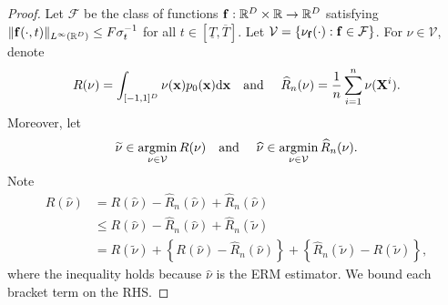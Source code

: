 \documentclass[twoside,11pt]{article}
\def\cF{\mathcal F}
\def\cV{\mathcal V}
\newcommand{\bff}{{\bf f}}
\newcommand{\bx}{{\bf x}}
\newcommand{\bX}{{\bf X}}
\newcommand{\bbR}{{\mathbb R}}
\newcommand{\be}{\begin{equation}}
\newcommand{\ee}{\end{equation}}
\newcommand{\bean}{\setlength\arraycolsep{1pt}\begin{eqnarray*}}
\newcommand{\eean}{\end{eqnarray*}}
\DeclareMathOperator*{\argmin}{argmin}
\def\d{{\rm d}}
\begin{document}
\begin{proof}
Let $\cF$ be the class of functions $\bff : \bbR^{D} \times \bbR \rightarrow \bbR^{D}$ satisfying $\| \bff(\cdot,t)\|_{L^{\infty}(\bbR^{D})} \leq F \sigma_{t}^{-1}$ for all $t \in [\underline{T}, \overline{T}]$.
Let $\cV = \{\nu_{\bff}(\cdot) : \bff \in \cF  \}$.
For $\nu \in \cV$, denote
\bean
R(\nu) = \int_{[-1,1]^{D}} \nu(\bx) p_0(\bx) \d \bx
\text{\quad and \quad}
\widehat R_{n}(\nu) = \frac{1}{n} \sum_{i=1}^{n} \nu(\bX^i).
\eean
Moreover, let
\bean
\widetilde{\nu} \in \argmin_{\nu \in \cV} R(\nu)
\text{\quad and \quad}
\widehat{\nu} \in \argmin_{\nu \in \cV} \widehat R_{n}(\nu).
\eean
Note 
\be
\begin{split}
R(\widehat \nu)
& = R(\widehat \nu) - \widehat R_{n}(\widehat \nu) + \widehat R_{n}(\widehat \nu)
\\
& \leq R(\widehat \nu) - \widehat R_{n}(\widehat \nu) + \widehat R_{n}(\widetilde \nu)
\\
& = R(\widetilde \nu) + \left\{ R(\widehat \nu) - \widehat R_{n}(\widehat \nu) \right\} + \left\{ \widehat R_{n}(\widetilde \nu) - R(\widetilde \nu) \right\},
\label{eq:exbd_totalbd}
\end{split}
\ee
where the inequality holds because $\widehat \nu$ is the ERM estimator.
We bound each bracket term on the RHS.


\end{proof}
\end{document}
